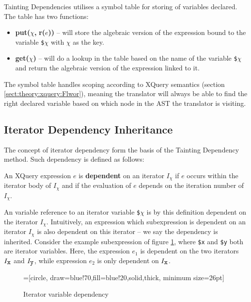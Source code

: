 Tainting Dependencies utilises a symbol table for storing of variables declared. The table has two functions:
\begin{itemize}
  \item \textbf{put(}$\chi$\textbf{, }\textbf{r(}$e$\textbf{))} -- will store the
  algebraic version of the expression bound to the variable \texttt{\$}$\chi$ with $\chi$ as the key.  
  \item \textbf{get(}$\chi$\textbf{)} -- will do a lookup in the table based on the name of the variable
  \texttt{\$}$\chi$ and return the algebraic version of the expression linked to it.
\end{itemize}
The symbol table handles scoping according to XQuery semantics (section \ref{sect:theory:xquery:Flwor}), meaning
the translator will always be able to find the right declared variable based on which node in the AST the
translator is visiting.

\subsection{Iterator Dependency Inheritance}
\label{sect:trans:TD:dependency}

The concept of iterator dependency form the basis of the Tainting Dependency method. Such dependency is
defined as follows:

\noindent
\begin{myDefinition}
An XQuery expression $e$ is \textbf{dependent} on an iterator $I_{\chi}$ if $e$
occurs within the iterator body of $I_{\chi}$ and if the evaluation of $e$ depends on the iteration number of $I_{\chi}$.
\label{def:iterVarDep}
\end{myDefinition}

An variable reference to an iterator variable \texttt{\$}$\chi$ is by this definition dependent on the iterator
$I_{\chi}$. Intuitively, an expression which subexpression is dependent on an iterator $I_{\chi}$ is also
dependent on this iterator -- we say the dependency is inherited. Consider the example subexpression of figure
\ref{fig:trans:td:varDep}, where \texttt{\$x} and \texttt{\$y} both are
iterator variables. Here, the expression $e_{1}$ is dependent on the two
iterators $I_{\mbox{\texttt{x}}}$ and $I_{\mbox{\texttt{y}}}$, while expression $e_{2}$ is only dependent on $I_{\mbox{\texttt{x}}}$.

\begin{figure}[h]
\centering
{}=[circle, draw=blue!70,fill=blue!20,solid,thick, minimum
size=26pt]
\label{fig:trans:td:varDep}
\caption[Iterator variable dependency]{Iterator variable dependency}
\end{figure}

